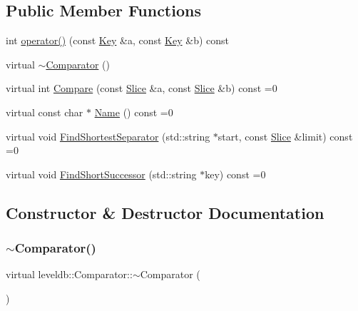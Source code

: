\subsection*{Public Member Functions}
\begin{DoxyCompactItemize}
\item 
int \mbox{\hyperlink{structleveldb_1_1_comparator_af56f4d3b86bd598dde1d1af379ea486d}{operator()}} (const \mbox{\hyperlink{namespaceleveldb_a7e9a9725b13fa0bd922d885280dfab95}{Key}} \&a, const \mbox{\hyperlink{namespaceleveldb_a7e9a9725b13fa0bd922d885280dfab95}{Key}} \&b) const
\item 
virtual \mbox{\hyperlink{structleveldb_1_1_comparator_a0637d3530450873fae87ab9c55b6f8e8}{$\sim$\+Comparator}} ()
\item 
virtual int \mbox{\hyperlink{structleveldb_1_1_comparator_a05dae6edcad3c7db23827c0233d74039}{Compare}} (const \mbox{\hyperlink{classleveldb_1_1_slice}{Slice}} \&a, const \mbox{\hyperlink{classleveldb_1_1_slice}{Slice}} \&b) const =0
\item 
virtual const char $\ast$ \mbox{\hyperlink{structleveldb_1_1_comparator_a888b039bdd6d59517dca75fb40721f5e}{Name}} () const =0
\item 
virtual void \mbox{\hyperlink{structleveldb_1_1_comparator_abdfe6076225e95b91ffd94f646063115}{Find\+Shortest\+Separator}} (std\+::string $\ast$start, const \mbox{\hyperlink{classleveldb_1_1_slice}{Slice}} \&limit) const =0
\item 
virtual void \mbox{\hyperlink{structleveldb_1_1_comparator_a49751dd906595633161dfad943d24b3b}{Find\+Short\+Successor}} (std\+::string $\ast$key) const =0
\end{DoxyCompactItemize}


\subsection{Constructor \& Destructor Documentation}
\mbox{\label{structleveldb_1_1_comparator_a0637d3530450873fae87ab9c55b6f8e8}} 
\subsubsection{\texorpdfstring{$\sim$Comparator()}{~Comparator()}}
{\footnotesize\ttfamily virtual leveldb\+::\+Comparator\+::$\sim$\+Comparator (\begin{DoxyParamCaption}{ }\end{DoxyParamCaption})\hspace{0.3cm}{\ttfamily [virtual]}}



